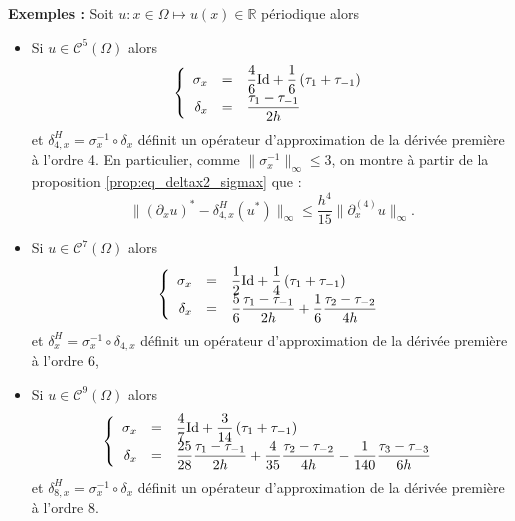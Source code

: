 \textbf{Exemples : }
Soit $u : x \in \Omega \mapsto u(x) \in \mathbb{R}$ périodique alors 
\begin{itemize}
\item Si $u \in \mathcal{C}^{5}(\Omega)$ alors 
\begin{equation}
\left\lbrace
\begin{array}{rcl}
\sigma_{x} &=& \dfrac{4}{6} \text{Id} + \dfrac{1}{6} \left( \tau_1 + \tau_{-1} \right)\\
\delta_{x} &=& \dfrac{\tau_1 - \tau_{-1}}{2h} \\ 
\end{array}
\right.
\label{eq:comp4}
\end{equation}
et $\delta^H_{4,x} = \sigma_x^{-1} \circ \delta_{x}$ définit un opérateur d'approximation de la dérivée première à l'ordre 4. En particulier, comme $\| \sigma_x^{-1} \|_{\infty} \leq 3$, on montre à partir de la proposition \ref{prop:eq_deltax2_sigmax} que :
\begin{equation}
\| (\partial_x u )^* - \delta_{4,x}^H (u^*) \|_{\infty} \leq \dfrac{h^4}{15} \| \partial_x^{(4)} u \|_{\infty}.
\label{eq:constante_err_derherm4}
\end{equation}

\item Si $u \in \mathcal{C}^{7}(\Omega)$ alors 
\begin{equation}
\left\lbrace
\begin{array}{rcl}
\sigma_{x} &=& \dfrac{1}{2} \text{Id} + \dfrac{1}{4}\left( \tau_1 + \tau_{-1} \right) \\
\delta_{x} &=& \dfrac{5}{6} \dfrac{\tau_1 - \tau_{-1}}{2h} + \dfrac{1}{6} \dfrac{\tau_2 - \tau_{-2}}{4h}\\ 
\end{array}
\right.
\label{eq:comp6}
\end{equation}
et $\delta^H_{x} = \sigma_{x}^{-1} \circ \delta_{4,x}$ définit un opérateur d'approximation de la dérivée première à l'ordre 6,


\item Si $u \in \mathcal{C}^{9}(\Omega)$ alors 
\begin{equation}
\left\lbrace
\begin{array}{rcl}
\sigma_{x} &=& \dfrac{4}{7} \text{Id} + \dfrac{3}{14}\left( \tau_1 + \tau_{-1} \right) \\
\delta_{x} &=& \dfrac{25}{28} \dfrac{\tau_1 - \tau_{-1}}{2h} + \dfrac{4}{35} \dfrac{\tau_2 - \tau_{-2}}{4h} - \dfrac{1}{140} \dfrac{\tau_3 - \tau_{-3}}{6h} \\ 
\end{array}
\right.
\label{eq:comp8}
\end{equation}
et $\delta^H_{8,x} = \sigma_{x}^{-1} \circ \delta_{x}$ définit un opérateur d'approximation de la dérivée première à l'ordre 8.
\end{itemize}


